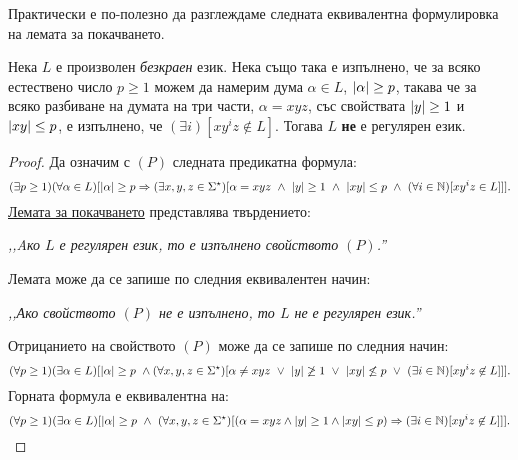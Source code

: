 Практически е по-полезно да разглеждаме следната еквивалентна формулировка на лемата за покачването.
\begin{cor}
  \label{cor:pumping-reg}
  Нека $L$ е произволен {\em безкраен} език. Нека също така е изпълнено, че за всяко естествено число $p \geq 1$ можем да намерим дума $\alpha \in L$, $\lvert{\alpha}\rvert\geq p$, такава че за всяко разбиване на думата на три части, $\alpha = xyz$,
  със свойствата $\lvert{y}\rvert \geq 1$ и $\lvert{xy}\rvert \leq p$, е изпълнено, че $(\exists i)[xy^iz \not\in L]$.
  Тогава $L$ {\bf не} е регулярен език.
\end{cor}
\begin{proof}
  Да означим с $(P)$ следната предикатна формула:
  {\scriptsize
    \[(\exists p \geq 1)(\forall \alpha \in L)[\lvert{\alpha}\rvert \geq p \Rightarrow (\exists x,y,z\in\Sigma^\star)[\alpha = xyz\ \wedge\ \lvert{y}\rvert \geq 1\ \wedge\ \lvert{xy}\rvert \leq p\ \wedge\ (\forall i\in\mathbb{N})[xy^iz \in L]]].\]}
  \hyperref[lem:pumping-reg]{Лемата за покачването} представлява твърдението:
  
  \begin{center}
  {\em ,,Aко $L$ е регулярен език, то е изпълнено свойството $(P)$.''}
  \end{center}
  \noindent
  Лемата може да се запише по следния еквивалентен начин:
  
  \begin{center}
    {\em ,,Ако свойството $(P)$ не е изпълнено, то $L$ не е регулярен език.''}
  \end{center}


  \noindent Отрицанието на свойството $(P)$ може да се запише по следния начин:
  {\scriptsize  \[(\forall p \geq 1)(\exists \alpha \in L)[\abs{\alpha} \geq p\ \wedge (\forall x,y,z\in\Sigma^\star)[\alpha \neq xyz\ \vee\ \abs{y} \not\geq 1\ \vee\ \abs{xy} \not\leq p\ \vee\ (\exists i\in\Nat)[xy^iz \not\in L]]].\]}
  Горната формула е еквивалентна на:
  {\scriptsize
    \[(\forall p \geq 1)(\exists \alpha \in L)[\lvert{\alpha}\rvert \geq p\ \wedge\ (\forall x,y,z\in\Sigma^\star)[(\alpha = xyz \wedge \lvert{y}\rvert \geq 1\wedge \lvert{xy}\rvert \leq p) \Rightarrow (\exists i\in\mathbb{N})[xy^iz \not\in L]]].\]}
\end{proof}

